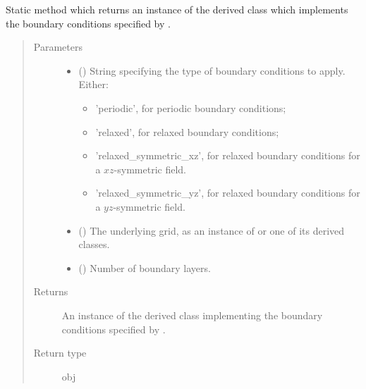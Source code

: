 \documentclass[letterpaper,10pt,english]{sphinxmanual}
\begin{document}
\begin{fulllineitems}
\begin{fulllineitems}
\label{\detokenize{api:tasmania.dycore.horizontal_boundary.HorizontalBoundary.factory}}
Static method which returns an instance of the derived class which implements the boundary
conditions specified by .
\begin{quote}\begin{description}
\item[{Parameters}] \leavevmode\begin{itemize}
\item {} 
 () \textendash{} 
String specifying the type of boundary conditions to apply. Either:
\begin{itemize}
\item {} 
’periodic’, for periodic boundary conditions;

\item {} 
’relaxed’, for relaxed boundary conditions;

\item {} 
’relaxed\_symmetric\_xz’, for relaxed boundary conditions for a \(xz\)-symmetric field.

\item {} 
’relaxed\_symmetric\_yz’, for relaxed boundary conditions for a \(yz\)-symmetric field.

\end{itemize}


\item {} 
 () \textendash{} The underlying grid, as an instance of {\hyperref[\detokenize{api:tasmania.grids.grid_xyz.GridXYZ}]{}} or one of its derived classes.

\item {} 
 () \textendash{} Number of boundary layers.

\end{itemize}

\item[{Returns}] \leavevmode
An instance of the derived class implementing the boundary conditions specified by
.

\item[{Return type}] \leavevmode
obj


\end{description}
\end{quote}
\end{fulllineitems}
\end{fulllineitems}
\end{document}
